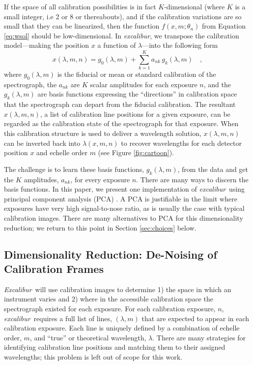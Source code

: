 \documentclass[twocolumn,table,xcolor,trackchanges]{aastex63}
\newcommand{\project}[1]{\textsl{#1}}
\newcommand{\name}{\project{excalibur}}
\newcommand{\Name}{\project{Excalibur}}
\begin{document}
If the space of all calibration possibilities is in fact $K$-dimensional (where $K$ is a small integer, i.e 2 or 8 or thereabouts), and if the calibration variations are so small that they can be linearized, then the function $f(x,m;\theta_{n})$ from Equation \ref{eq:wsol} should be low-dimensional.  In \name, we transpose the calibration model---making the position $x$ a function of $\lambda$---into the following form
\begin{equation}
x(\lambda,m,n) = g_0(\lambda,m) + \sum_{k=1}^K a_{nk}\,g_k(\lambda,m)
\quad ,
\label{eq:excl_wsol}
\end{equation}
where
$g_0(\lambda,m)$ is the fiducial or mean or standard calibration of the spectrograph,
the $a_{nk}$ are $K$ scalar amplitudes for each exposure $n$, and the $g_k(\lambda,m)$ are basis functions expressing the ``directions'' in calibration space that the spectrograph can depart from the fiducial calibration.  The resultant $x(\lambda,m,n)$, a list of calibration line positions for a given exposure, can be regarded as the calibration state of the spectrograph for that exposure.  When this calibration structure is used to deliver a wavelength solution, $x(\lambda,m,n)$ can be inverted back into $\lambda(x,m,n)$ to recover wavelengths for each detector position $x$ and echelle order $m$ (see Figure \ref{fig:cartoon}).

The challenge is to learn these basis functions, $g_k(\lambda,m)$, from the data and get the $K$ amplitudes, $a_{nk}$, for every exposure $n$.  There are many ways to discern the basis functions.  In this paper, we present one implementation of \name\ using principal component analysis (PCA) .  A PCA is justifiable in the limit where exposures have very high signal-to-nose ratio, as is usually the case with typical calibration images.  There are many alternatives to PCA for this dimensionality reduction; we return to this point in Section \ref{sec:choices} below.

\subsection{Dimensionality Reduction: De-Noising of Calibration Frames} \label{sec:denoising}
\Name\ will use calibration images to determine 1) the space in which an instrument varies and 2) where in the accessible calibration space the spectrograph existed for each exposure.  For each calibration exposure, $n$, \name\ requires a full list of lines, $(\lambda,m)$ that are expected to appear in each calibration exposure.  Each line is uniquely defined by a combination of echelle order, $m$, and ``true'' or theoretical wavelength, $\lambda$.  There are many strategies for identifying calibration line positions and matching them to their assigned wavelengths; this problem is left out of scope for this work.  
\end{document}
